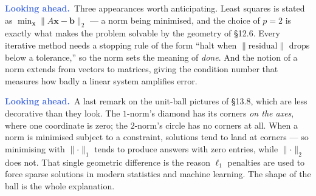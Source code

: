 \documentclass[11pt]{article}
\theoremstyle{definition}
\theoremstyle{remark}
\newcommand{\lookahead}{\par\smallskip\noindent
  \textbf{\sffamily\textcolor{RoyalBlue}{Looking ahead.}}\ \ignorespaces}
\newcommand{\vc}[1]{\mathbf{#1}}
\newcommand{\norm}[1]{\lVert #1\rVert}
\begin{document}
\lookahead Three appearances worth anticipating. Least squares is stated as
$\min_{\vc{x}}\norm{A\vc{x}-\vc{b}}_2$ --- a norm being minimised, and the choice
of $p=2$ is exactly what makes the problem solvable by the geometry of \S12.6.
Every iterative method needs a stopping rule of the form ``halt when
$\norm{\text{residual}}$ drops below a tolerance,'' so the norm sets the meaning
of \emph{done}. And the notion of a norm extends from vectors to matrices,
giving the condition number that measures how badly a linear system amplifies
error.

\lookahead A last remark on the unit-ball pictures of \S13.8, which are less
decorative than they look. The $1$-norm's diamond has its corners \emph{on the
axes}, where one coordinate is zero; the $2$-norm's circle has no corners at all.
When a norm is minimised subject to a constraint, solutions tend to land at
corners --- so minimising with $\norm{\cdot}_1$ tends to produce answers with
zero entries, while $\norm{\cdot}_2$ does not. That single geometric difference
is the reason $\ell_1$ penalties are used to force sparse solutions in modern
statistics and machine learning. The shape of the ball is the whole explanation.
\end{document}
